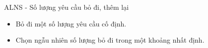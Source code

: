 \begin{frame}{ALNS - Số lượng yêu cầu bỏ đi, thêm lại}
  \begin{itemize}
    \item Bỏ đi một số lượng yêu cầu cố định. 
    \item Chọn ngẫu nhiên số lượng bỏ đi trong một khoảng nhất định.
  \end{itemize}
\end{frame}

